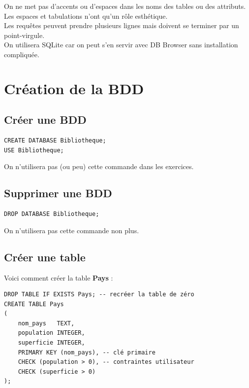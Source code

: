 \documentclass[10pt,cours,a4paper,firamath]{nsi}
\begin{document}
On ne met pas d'accents ou d'espaces dans les noms des tables ou des attributs.\\

Les espaces et tabulations n'ont qu'un rôle esthétique.\\

Les requêtes peuvent prendre plusieurs lignes mais doivent se terminer par un point-virgule.\\

On utilisera SQLite car on peut s'en servir avec DB Browser sans installation compliquée.

\section{Création de la BDD}
\subsection{Créer une BDD}

\begin{sql}
    \begin{verbatim}
CREATE DATABASE Bibliotheque;
USE Bibliotheque;
\end{verbatim}
\end{sql}

On n'utilisera pas (ou peu) cette commande dans les exercices.


\subsection{Supprimer une BDD}

\begin{sql}
    \begin{verbatim}
DROP DATABASE Bibliotheque;
	\end{verbatim}
\end{sql}

On n'utilisera pas cette commande non plus.


\subsection{Créer une table}
Voici comment créer la table \textbf{Pays} :

\begin{sql}
    \begin{verbatim}
DROP TABLE IF EXISTS Pays; -- recréer la table de zéro
CREATE TABLE Pays
(
    nom_pays   TEXT,
    population INTEGER,
    superficie INTEGER,
    PRIMARY KEY (nom_pays), -- clé primaire
    CHECK (population > 0), -- contraintes utilisateur
    CHECK (superficie > 0)
);
\end{verbatim}
\end{sql}
\end{document}
